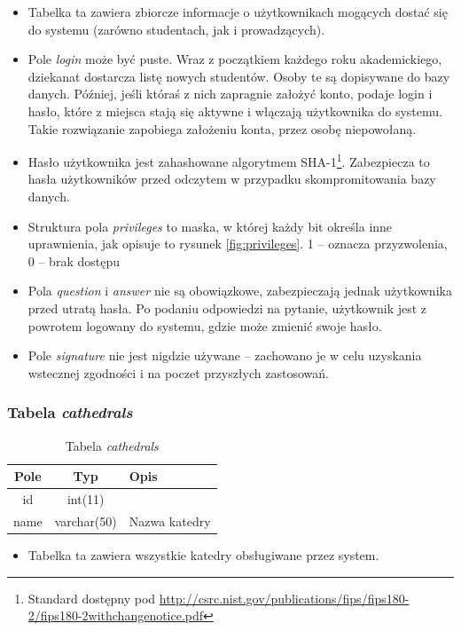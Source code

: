 \documentclass[a4paper,12pt,oneside]{report}
\begin{document}
\begin{itemize}
  \item Tabelka ta zawiera zbiorcze informacje o użytkownikach mogących dostać się do systemu (zarówno studentach, jak i prowadzących).
  \item Pole \emph{login} może być puste. Wraz z początkiem każdego roku akademickiego, dziekanat dostarcza listę nowych studentów. Osoby te są dopisywane do bazy danych. Później, jeśli któraś z nich zapragnie założyć konto, podaje login i hasło, które z miejsca stają się aktywne i włączają użytkownika do systemu. Takie rozwiązanie zapobiega założeniu konta, przez osobę niepowołaną.
  \item Hasło użytkownika jest zahashowane algorytmem SHA-1\footnote{Standard dostępny pod \url{http://csrc.nist.gov/publications/fips/fips180-2/fips180-2withchangenotice.pdf}}. Zabezpiecza to hasła użytkowników przed odczytem w przypadku skompromitowania bazy danych.
  \item Struktura pola \emph{privileges} to maska, w której każdy bit określa inne uprawnienia, jak opisuje to rysunek \ref{fig:privileges}. 1 -- oznacza przyzwolenia, 0 -- brak dostępu
  \item Pola \emph{question} i \emph{answer} nie są obowiązkowe, zabezpieczają jednak użytkownika przed utratą hasła. Po podaniu odpowiedzi na pytanie, użytkownik jest z powrotem logowany do systemu, gdzie może zmienić swoje hasło.
  \item Pole \emph{signature} nie jest nigdzie używane -- zachowano je w celu uzyskania wstecznej zgodności i na poczet przyszłych zastosowań.
\end{itemize}

\subsubsection{Tabela \emph{cathedrals}}
\label{subsub:cathedrals}

\begin{table}[h]
  \centering
  \begin{tabular}{|c|c|l|}\hline
  Pole & Typ & Opis \\\hline
  id              & int(11)      & \\
  name & varchar(50) & Nazwa katedry \\\hline
  \end{tabular}
  \caption{Tabela \emph{cathedrals}\label{tab:cathedrals}}
\end{table}

\begin{itemize}
  \item Tabelka ta zawiera wszystkie katedry obsługiwane przez system.
\end{itemize}
\end{document}
